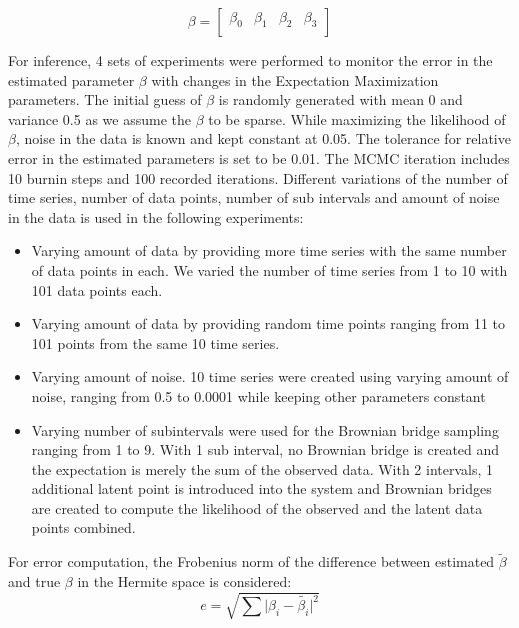 \documentclass{article}
\begin{document}
\begin{equation}
\beta =
\begin{bmatrix}
    \beta_0 & \beta_1 & \beta_2 & \beta_3 \\
\end{bmatrix}
\end{equation}

For inference, 4 sets of experiments were performed to monitor the error in the estimated parameter $\beta$ with changes in the Expectation Maximization parameters. The initial guess of $\beta$ is randomly generated with mean 0 and variance 0.5 as we assume the $\beta$ to be sparse. While maximizing the likelihood of $\beta$, noise in the data is known and kept constant at 0.05. The tolerance for relative error in the estimated parameters is set to be 0.01. The MCMC iteration includes 10 burnin steps and 100 recorded iterations. Different variations of the number of time series, number of data points, number of sub intervals and amount of noise in the data is used in the following experiments:
\begin{itemize}
\item Varying amount of data by providing more time series with the same number of data points in each. We varied the number of time series from 1 to 10 with 101 data points each.
\item Varying amount of data by providing random time points ranging from 11 to 101 points from the same 10 time series.
\item Varying amount of noise. 10 time series were created using varying amount of noise, ranging from 0.5 to 0.0001 while keeping other parameters constant
\item Varying number of subintervals were used for the Brownian bridge sampling ranging from 1 to 9. With 1 sub interval, no Brownian bridge is created and the expectation is merely the sum of the observed data. With 2 intervals, 1 additional latent point is introduced into the system and Brownian bridges are created to compute the likelihood of the observed and the latent data points combined.
\end{itemize}

For error computation, the Frobenius norm of the difference between estimated $\tilde{\beta}$ and true $\beta$ in the Hermite space is considered:
\begin{equation}
e = \sqrt{\sum \rvert \beta_i - \tilde{\beta_i} \rvert ^2}
\end{equation}
\end{document}

